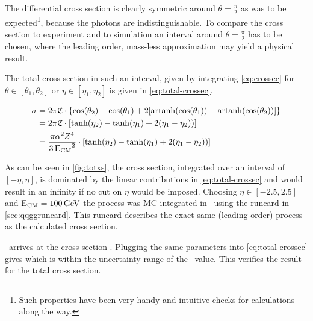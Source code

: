 The differential cross section is clearly symmetric around
\(\theta=\frac{\pi}{2}\) as was to be expected\footnote{Such
  properties have been very handy and intuitive checks for
  calculations along the way.}, because the photons are
indistinguishable. To compare the cross section to experiment and to
simulation an interval around \(\theta=\frac{\pi}{2}\) has to be
chosen, where the leading order, mass-less approximation may yield a
physical result.

The total cross section in such an interval, given by
integrating \cref{eq:crossec} for \(\theta\in [\theta_1, \theta_2]\)
or \(\eta\in [\eta_1, \eta_2]\) is given
in \cref{eq:total-crossec}.

\begin{equation}
  \label{eq:total-crossec}
  \begin{split}
  \sigma &=
  2\pi\mathfrak{C}\cdot\qty{\cos(\theta_2)-\cos(\theta_1)+2\qty[\operatorname{artanh}(\cos(\theta_1))
    - \operatorname{artanh}(\cos(\theta_2))]} \\
  &=2\pi\mathfrak{C}\cdot\qty[\tanh(\eta_2) - \tanh(\eta_1) + 2(\eta_1
  - \eta_2))] \\
  &={\frac{\pi\alpha^2Z^4}{3\operatorname{E_{\text{CM}}}^2}}\cdot\qty[\tanh(\eta_2) - \tanh(\eta_1) + 2(\eta_1
  - \eta_2))]
  \end{split}
\end{equation}

As can be seen in \cref{fig:totxs}, the cross section, integrated over
an interval of \([-\eta, \eta]\), is dominated by the linear
contributions in \cref{eq:total-crossec} and would result in an
infinity if no cut on \(\eta\) would be imposed. Choosing
\(\eta\in [-2.5,2.5]\) and \(\operatorname{E_{\text{CM}}}=\SI{100}{\giga\electronvolt}\) the
process was MC integrated in \sherpa\ using the runcard in
\cref{sec:qqggruncard}. This runcard describes the exact same (leading
order) process as the calculated cross section.

\sherpa\ arrives at the cross section . Plugging
the same parameters into \cref{eq:total-crossec} gives
 which is within the uncertainty range of the
\sherpa\ value. This verifies the result for the total cross section.

